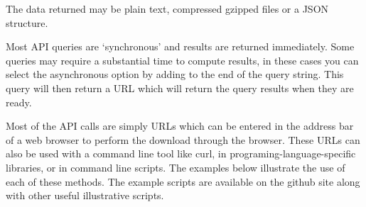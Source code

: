 \documentclass[letterpaper,10pt,english]{sphinxmanual}
\begin{document}
The data returned may be plain text, compressed gzipped files or a JSON
structure.

Most API queries are ‘synchronous’ and results are returned immediately.
Some queries may require a substantial time to compute results, in these
cases you can select the asynchronous option by adding
 to the end of the query string. This query will
then return a URL which will return the query results when they are
ready.

Most of the API calls are simply URLs which can be entered in the
address bar of a web browser to perform the download through the
browser. These URLs can also be used with a command line tool like curl,
in programing-language-specific libraries, or in command line scripts.
The examples below illustrate the use of each of these methods. The
example scripts are available on the github site along with other useful
illustrative scripts.
\end{document}
